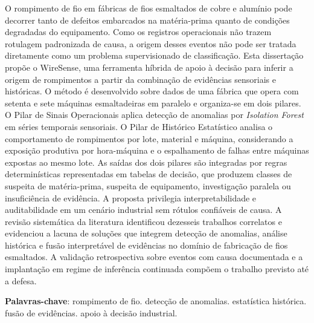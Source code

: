 
\setlength{\absparsep}{18pt} %

\begin{resumo}

O rompimento de fio em fábricas de fios esmaltados de cobre e alumínio pode decorrer tanto de defeitos embarcados na matéria-prima quanto de condições degradadas do equipamento. Como os registros operacionais não trazem rotulagem padronizada de causa, a origem desses eventos não pode ser tratada diretamente como um problema supervisionado de classificação. Esta dissertação propõe o WireSense, uma ferramenta híbrida de apoio à decisão para inferir a origem de rompimentos a partir da combinação de evidências sensoriais e históricas. O método é desenvolvido sobre dados de uma fábrica que opera com setenta e sete máquinas esmaltadeiras em paralelo e organiza-se em dois pilares. O Pilar de Sinais Operacionais aplica detecção de anomalias por \emph{Isolation Forest} em séries temporais sensoriais. O Pilar de Histórico Estatístico analisa o comportamento de rompimentos por lote, material e máquina, considerando a exposição produtiva por hora-máquina e o espalhamento de falhas entre máquinas expostas ao mesmo lote. As saídas dos dois pilares são integradas por regras determinísticas representadas em tabelas de decisão, que produzem classes de suspeita de matéria-prima, suspeita de equipamento, investigação paralela ou insuficiência de evidência. A proposta privilegia interpretabilidade e auditabilidade em um cenário industrial sem rótulos confiáveis de causa. A revisão sistemática da literatura identificou dezesseis trabalhos correlatos e evidenciou a lacuna de soluções que integrem detecção de anomalias, análise histórica e fusão interpretável de evidências no domínio de fabricação de fios esmaltados. A validação retrospectiva sobre eventos com causa documentada e a implantação em regime de inferência continuada compõem o trabalho previsto até a defesa.

\textbf{Palavras-chave}: rompimento de fio. detecção de anomalias. estatística histórica. fusão de evidências. apoio à decisão industrial.
\end{resumo}

